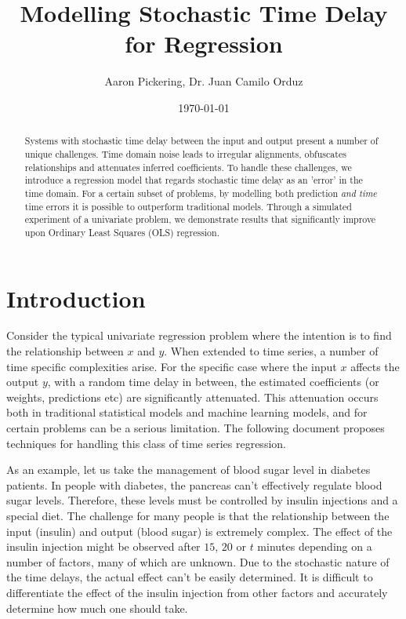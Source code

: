 \documentclass[11pt]{amsart}
\begin{document}
\title{Modelling Stochastic Time Delay for Regression}
\author{Aaron Pickering, Dr. Juan Camilo Orduz}
\date{\today}
\maketitle

\begin{abstract}
Systems with stochastic time delay between the input and output present a number of unique challenges. 
Time domain noise leads to irregular alignments, obfuscates relationships and attenuates inferred coefficients. 
To handle these challenges, we introduce a regression model that regards stochastic time delay as an 'error' in the time domain. For a certain subset of problems, by modelling both prediction \emph{and time} time errors it is possible to outperform traditional models.
Through a simulated experiment of a univariate problem, we demonstrate results that significantly improve upon Ordinary Least Squares (OLS) regression.
\end{abstract}

\section{Introduction}

Consider the typical univariate regression problem where the intention is to find the relationship between $x$ and $y$. When extended to time series, a number of time specific complexities arise. For the specific case where the input $x$ affects the output $y$, with a random time delay in between, the estimated coefficients (or weights, predictions etc) are significantly attenuated. This attenuation occurs both in traditional statistical models and machine learning models, and for certain problems can be a serious limitation. The following document proposes techniques for handling this class of time series regression.

As an example, let us take the management of blood sugar level in diabetes patients. In people with diabetes, the pancreas can't effectively regulate blood sugar levels. Therefore, these levels must be controlled by insulin injections and a special diet. The challenge for many people is that the relationship between the input (insulin) and output (blood sugar) is extremely complex. The effect of the insulin injection might be observed after $15$, $20$  or $t$ minutes depending on a number of factors, many of which are unknown. Due to the stochastic nature of the time delays, the actual effect can't be easily determined. It is difficult to differentiate the effect of the insulin injection from other factors and accurately determine how much one should take.
\end{document}
